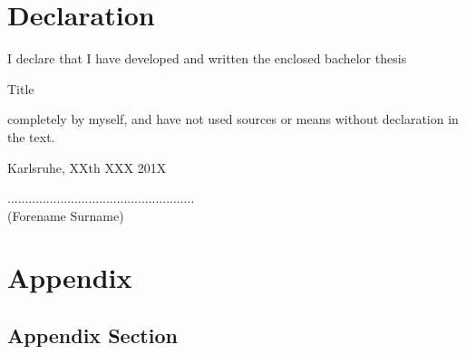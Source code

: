 \documentclass[a4paper,12pt]{article}%
\begin{document}
\newpage
\section*{Declaration}

\vspace{2cm}
\begin{flushleft}
    I declare that I have developed and written the enclosed
    bachelor thesis\\[-0.3cm]
\end{flushleft}
\begin{center}
    {\large Title}\\[0.5cm]
\end{center}
    completely by myself, and have not used sources or means without
    declaration in the text.\\[2.5cm]

\begin{flushleft}
    Karlsruhe, XXth XXX 201X\\[0.1cm]
\end{flushleft}
\hspace*{9.0cm}.....................................................\\
\hspace*{10.1cm}(Forename Surname)

\newpage
{} %
%
%
%
%
\printbibliography


\newpage
{} \nocite{*}
\section*{Appendix}
\renewcommand{\thesubsection}{\Alph{subsection}}
\subsection*{Appendix Section}

\newpage
\listoftodos[Todos]
\end{document}
